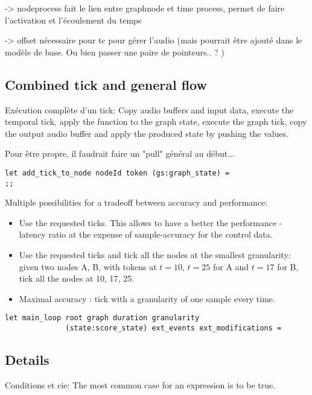 \documentclass{article}
\begin{document}
-> nodeprocess fait le lien entre graphnode et time process, permet de faire l'activation et l'écoulement du temps

-> offset nécessaire pour tc pour gérer l'audio (mais pourrait être ajouté dans le modèle de base. Ou bien passer une paire de pointeurs.. ? )

\subsection{Combined tick and general flow}
Exécution complète d'un tick: 
Copy audio buffers and input data, execute the temporal tick, apply the function to the graph state, execute the graph tick, copy the output audio buffer and apply the produced state by pushing the values.


Pour être propre, il faudrait faire un "pull" général au début...

\begin{lstlisting}
let add_tick_to_node nodeId token (gs:graph_state) =
;;
\end{lstlisting}

Multiple possibilities for a tradeoff between accuracy and performance: 
\begin{itemize}
	\item Use the requested ticks. This allows to have a better the performance - latency ratio at the expense of sample-accuracy for the control data.
	\item Use the requested ticks and tick all the nodes at the smallest granularity: 
	given two nodes A, B, with tokens at $t=10$, $t=25$ for A and $t=17$ for B, tick all the nodes at 10, 17, 25.
	\item Maximal accuracy : tick with a granularity of one sample every time.
\end{itemize}



\begin{lstlisting}
let main_loop root graph duration granularity 
			  (state:score_state) ext_events ext_modifications =

\end{lstlisting}



\subsection{Details}

Conditions et cie: The most common case for an expression is to be true.
\end{document}
